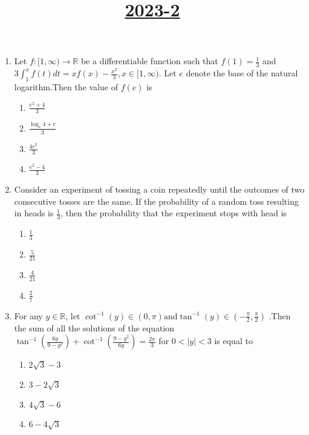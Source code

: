 \documentclass[12pt,a4paper]{article}
\begin{document}
\title{\underline{\textbf{2023-2}}}      \date{}\maketitle                    
\begin{enumerate}
\item Let $f :[1, \infty) \to \mathbb{R}$ be a differentiable function such that
$f(1) = \frac{1}{3}$ and $3 \int_{1}^{x}  f(t) dt = x f(x) - \frac{x^2}{3},x \in [1, \infty).$ Let $e$ denote the base of the natural logarithm.Then the value of $f(e)$ is\\
\begin{enumerate}[label=\Alph*.]
\item $\frac{e^2+4}{3}$
\item $\frac{\log_{e}{4} + e}{3}$
\item $\frac{4e^2}{3}$
\item $\frac{e^2-4}{3}$
\end{enumerate}
                                                \item Consider an experiment of tossing a coin repeatedly until the outcomes of two consecutive tosses are the same. If the probability of a random toss resulting in heads is $\frac{1}{3}$, then the probability that the experiment stops with head is\\
\begin{enumerate}[label=\Alph*.]
\item $\frac{1}{3}$                             \item $\frac{5}{21}$                            \item $\frac{4}{21}$
\item $\frac{2}{7}$
\end{enumerate}

\item For any $y \in \mathbb{R}$, let $\cot^{-1}(y) \in (0, \pi) \text{and} \tan^{-1}(y) \in \left( -\frac{\pi}{2}, \frac{\pi}{2} \right)$ .Then the sum of all the solutions of the equation $\tan^{-1}(\frac{6y}{9-y^2}) + \cot^{-1}(\frac{9-y^2}{6y}) =\frac{2\pi}{3}$ for $0 < |y| < 3$ is equal to\\
\begin{enumerate}[label=\Alph*.]
\item $2\sqrt{3}-3$
\item $3 - 2\sqrt{3}$
\item $4\sqrt{3} - 6$
\item $6-4\sqrt{3}$
\end{enumerate}




\end{enumerate}
\end{document}
